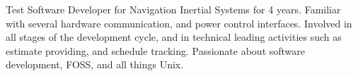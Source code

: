 

\begin{cvparagraph}

Test Software Developer for Navigation Inertial Systems for 4 years. Familiar with several hardware communication, and power control interfaces. Involved in all stages of the development cycle, and in technical leading activities such as estimate providing, and schedule tracking. Passionate about software development, FOSS, and all things Unix.

\end{cvparagraph}
